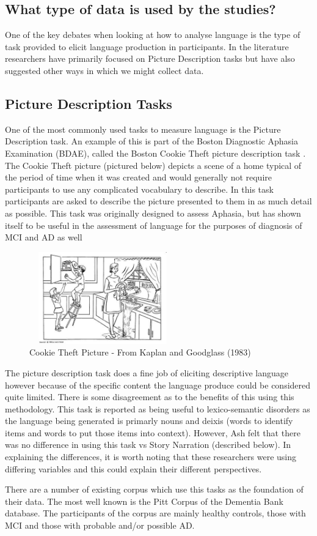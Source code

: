\subsection{What type of data is used by the studies?}
One of the key debates when looking at how to analyse language is the type of task provided to elicit language production in participants. In the literature researchers have primarily focused on Picture Description tasks but have also suggested other ways in which we might collect data.
\par
\subsection{Picture Description Tasks}
One of the most commonly used tasks to measure language is the Picture Description task. An example of this is part of the Boston Diagnostic Aphasia Examination (BDAE), called the Boston Cookie Theft picture description task \cite{Borod1980}. The Cookie Theft picture (pictured below) depicts a scene of a home typical of the period of time when it was created and would generally not require participants to use any complicated vocabulary to describe. In this task participants are asked to describe the picture presented to them in as much detail as possible.  This task was originally designed to assess Aphasia, but has shown itself to be useful in the assessment of language for the purposes of diagnosis of MCI and AD as well \cite{Giles1996}
\begin{figure}[H]
\centering
\includegraphics[width=240px, height=150px]{images/BCTPicture.png}
\caption{Cookie Theft Picture - From Kaplan and Goodglass (1983)}
\end{figure}
\par
The picture description task does a fine job of eliciting descriptive language however because of the specific content the language produce could be considered quite limited. There is some disagreement as to the benefits of this using this methodology. This task is reported as being useful to lexico-semantic disorders \cite{Boschi2017, Sajjadi2012} as the language being generated is primarly nouns and deixis (words to identify items and words to put those items into context). However, Ash \cite{Ash2012}felt that there was no difference in using this task vs Story Narration (described below). In explaining the differences, it is worth noting that these researchers were using differing variables and this could explain their different perspectives.
\par 
There are a number of existing corpus which use this tasks as the foundation of their data. The most well known is the Pitt Corpus of the Dementia Bank database. The participants of the corpus are mainly healthy controls, those with MCI and those with probable and/or possible AD. 
